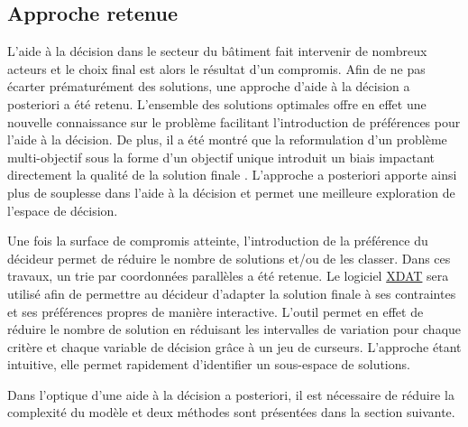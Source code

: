 \subsection{Approche retenue} %
\label{sub:approche_retenue}
L’aide à la décision dans le secteur du bâtiment fait intervenir de nombreux acteurs et le
choix final est alors le résultat d’un compromis. Afin de ne pas écarter prématurément des
solutions, une approche d’aide à la décision a posteriori a été retenu. L’ensemble des
solutions optimales offre en effet une nouvelle connaissance sur le problème facilitant
l’introduction de préférences pour l’aide à la décision. De plus, il a été montré que la
reformulation d’un problème multi-objectif sous la forme d’un objectif unique introduit un
biais impactant directement la qualité de la solution finale \parencite{Blondeau2002165}.
L’approche a posteriori apporte ainsi plus de souplesse dans l’aide à la décision et
permet une meilleure exploration de l’espace de décision.

Une fois la surface de compromis atteinte, l’introduction de la préférence du décideur
permet de réduire le nombre de solutions et/ou de les classer. Dans ces travaux, un trie
par coordonnées parallèles \parencite{Inselberg198725} a été retenue. Le logiciel
\href{http://www.xdat.org/}{XDAT} sera utilisé afin de permettre au décideur d’adapter la
solution finale à ses contraintes et ses préférences propres de manière interactive.
L’outil permet en effet de réduire le nombre de solution en réduisant les intervalles de variation
pour chaque critère et chaque variable de décision grâce à un jeu de curseurs. L’approche
étant intuitive, elle permet rapidement d’identifier un sous-espace de solutions.


Dans l’optique d’une aide à la décision a posteriori, il est nécessaire de réduire la
complexité du modèle et deux méthodes sont présentées dans la section suivante.




